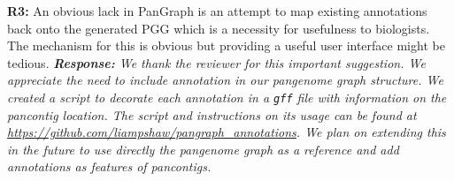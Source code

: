 \documentclass[aps,rmp,onecolumn]{revtex4-1}
\newcommand{\Marco}[1]{{\color{orange}Marco: #1}}
\newcommand{\Liam}[1]{{\color{teal}Liam: #1}}
\newcommand{\reviewer}[2]{\textbf{#1:} #2\vskip 5mm}
\newcommand{\response}[1]{{\it {\color{response}\textbf{Response:} #1}}\vskip 5mm}
\begin{document}
\reviewer{R3}{An obvious lack in PanGraph is an attempt to map existing annotations back onto the generated PGG which is a necessity for usefulness to biologists. The mechanism for this is obvious but providing a useful user interface might be tedious.}
\response{We thank the reviewer for this important suggestion. We appreciate the need to include annotation in our pangenome graph structure. We created a script to decorate each annotation in a \texttt{gff} file with information on the pancontig location. The script and instructions on its usage can be found at \url{https://github.com/liampshaw/pangraph\_annotations}. We plan on extending this in the future to use directly the pangenome graph as a reference and add annotations as features of pancontigs.
}
\end{document}
